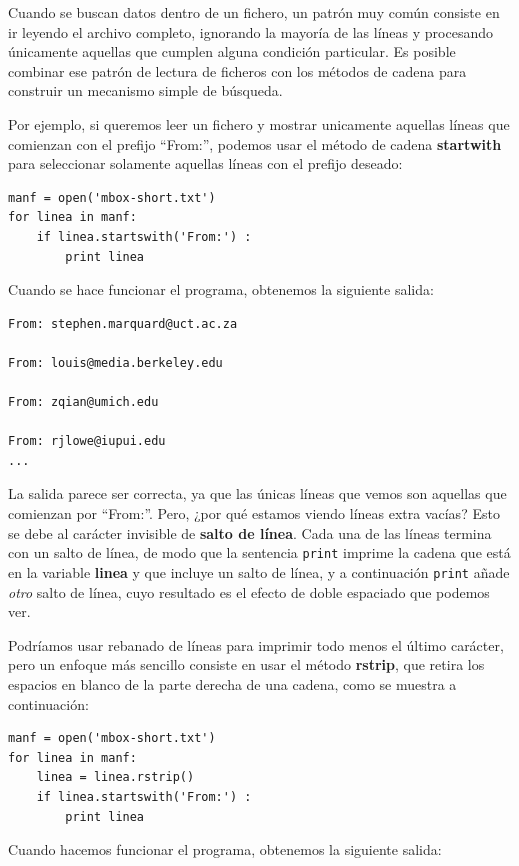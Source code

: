 Cuando se buscan datos dentro de un fichero, un
patrón muy común consiste en ir leyendo el archivo completo, ignorando
la mayoría de las líneas y procesando únicamente aquellas que cumplen alguna condición
particular. Es posible combinar ese patrón de lectura de ficheros con los métodos de cadena
para construir un mecanismo simple de búsqueda.

Por ejemplo, si queremos leer un fichero y mostrar unicamente aquellas líneas
que comienzan con el prefijo ``From:'', podemos usar el
método de cadena {\bf startwith} para seleccionar solamente aquellas líneas con
el prefijo deseado:

\beforeverb
\begin{verbatim}
manf = open('mbox-short.txt')
for linea in manf:
    if linea.startswith('From:') :
        print linea
\end{verbatim}
\afterverb
%
Cuando se hace funcionar el programa, obtenemos la siguiente salida:

\beforeverb
\begin{verbatim}
From: stephen.marquard@uct.ac.za

From: louis@media.berkeley.edu

From: zqian@umich.edu

From: rjlowe@iupui.edu
...
\end{verbatim}
\afterverb
%
La salida parece ser correcta, ya que las únicas líneas que vemos son aquellas
que comienzan por ``From:''. Pero, ¿por qué estamos viendo líneas extra
vacías? Esto se debe al carácter invisible de {\bf salto de línea}.
Cada una de las líneas termina con un salto de línea, de modo que la sentencia
{\tt print} imprime la cadena que está en la variable {\bf linea} y que
incluye un salto de línea, y a continuación {\tt print} añade \emph{otro} salto de línea,
cuyo resultado es el efecto de doble espaciado que podemos ver.

Podríamos usar rebanado de líneas para imprimir todo menos el último carácter, pero
un enfoque más sencillo consiste en usar el método {\bf rstrip}, que retira
los espacios en blanco de la parte derecha de una cadena, como se muestra a continuación:

\beforeverb
\begin{verbatim}
manf = open('mbox-short.txt')
for linea in manf:
    linea = linea.rstrip()
    if linea.startswith('From:') :
        print linea
\end{verbatim}
\afterverb
%
Cuando hacemos funcionar el programa, obtenemos la siguiente salida:

